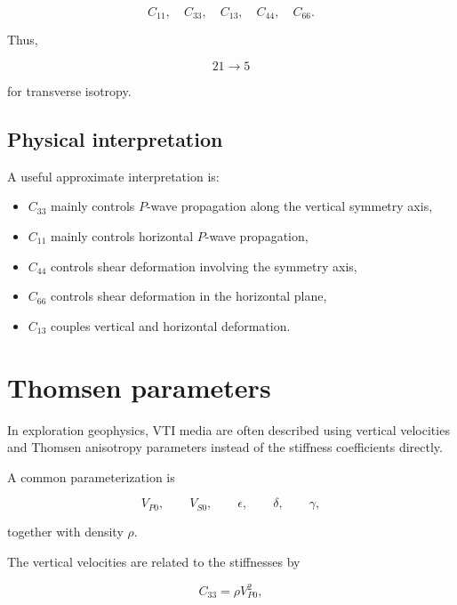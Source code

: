 \documentclass[11pt]{article}
\begin{document}
\begin{equation}
    \boxed{
    C_{11},\quad
    C_{33},\quad
    C_{13},\quad
    C_{44},\quad
    C_{66}.
    }
\end{equation}

Thus,

\begin{equation}
    \boxed{21 \longrightarrow 5}
\end{equation}

for transverse isotropy.

\subsection{Physical interpretation}

A useful approximate interpretation is:

\begin{itemize}
    \item $C_{33}$ mainly controls $P$-wave propagation along the vertical symmetry axis,
    \item $C_{11}$ mainly controls horizontal $P$-wave propagation,
    \item $C_{44}$ controls shear deformation involving the symmetry axis,
    \item $C_{66}$ controls shear deformation in the horizontal plane,
    \item $C_{13}$ couples vertical and horizontal deformation.
\end{itemize}

\section{Thomsen parameters}

In exploration geophysics, VTI media are often described using vertical velocities and Thomsen anisotropy parameters instead of the stiffness coefficients directly.

A common parameterization is

\begin{equation}
    V_{P0},\qquad
    V_{S0},\qquad
    \epsilon,\qquad
    \delta,\qquad
    \gamma,
\end{equation}

together with density $\rho$.

The vertical velocities are related to the stiffnesses by

\begin{equation}
    C_{33} = \rho V_{P0}^2,
\end{equation}
\end{document}
